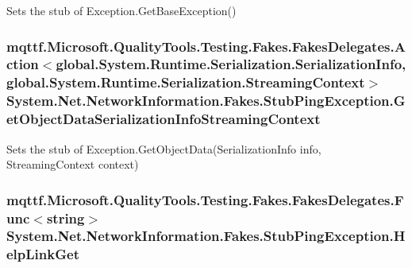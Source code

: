 Sets the stub of Exception.\-Get\-Base\-Exception()

\hypertarget{class_system_1_1_net_1_1_network_information_1_1_fakes_1_1_stub_ping_exception_a6187fc7c50d40018021e33602fc2de1c}{
\subsubsection[{Get\-Object\-Data\-Serialization\-Info\-Streaming\-Context}]{\setlength{\rightskip}{0pt plus 5cm}mqttf.\-Microsoft.\-Quality\-Tools.\-Testing.\-Fakes.\-Fakes\-Delegates.\-Action$<$global.\-System.\-Runtime.\-Serialization.\-Serialization\-Info, global.\-System.\-Runtime.\-Serialization.\-Streaming\-Context$>$ System.\-Net.\-Network\-Information.\-Fakes.\-Stub\-Ping\-Exception.\-Get\-Object\-Data\-Serialization\-Info\-Streaming\-Context}}\label{class_system_1_1_net_1_1_network_information_1_1_fakes_1_1_stub_ping_exception_a6187fc7c50d40018021e33602fc2de1c}


Sets the stub of Exception.\-Get\-Object\-Data(\-Serialization\-Info info, Streaming\-Context context)

\hypertarget{class_system_1_1_net_1_1_network_information_1_1_fakes_1_1_stub_ping_exception_a42475fd21644168336def281e524fab4}{
\subsubsection[{Help\-Link\-Get}]{\setlength{\rightskip}{0pt plus 5cm}mqttf.\-Microsoft.\-Quality\-Tools.\-Testing.\-Fakes.\-Fakes\-Delegates.\-Func$<$string$>$ System.\-Net.\-Network\-Information.\-Fakes.\-Stub\-Ping\-Exception.\-Help\-Link\-Get}}\label{class_system_1_1_net_1_1_network_information_1_1_fakes_1_1_stub_ping_exception_a42475fd21644168336def281e524fab4}


